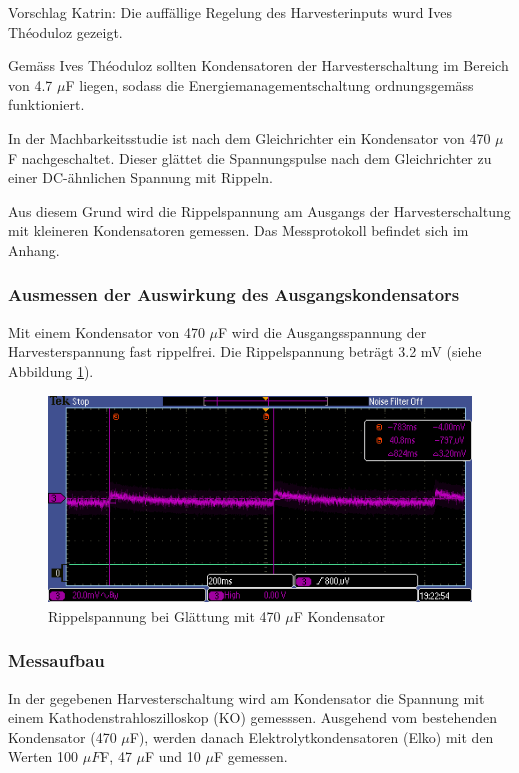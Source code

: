 Vorschlag Katrin:
Die auffällige Regelung des Harvesterinputs wurd Ives Théoduloz gezeigt. 

Gemäss Ives Théoduloz sollten Kondensatoren der Harvesterschaltung im Bereich von 4.7 $\mu$F liegen, sodass die Energiemanagementschaltung ordnungsgemäss funktioniert.  


In der Machbarkeitsstudie ist nach dem Gleichrichter ein Kondensator von 470 $\mu$F nachgeschaltet. Dieser glättet die Spannungspulse nach dem Gleichrichter zu einer DC-ähnlichen Spannung mit Rippeln.

Aus diesem Grund wird die Rippelspannung am Ausgangs der Harvesterschaltung mit kleineren Kondensatoren gemessen. Das Messprotokoll befindet sich im Anhang.

\subsubsection{Ausmessen der Auswirkung des Ausgangskondensators}

Mit einem Kondensator von 470 $\mu$F wird die Ausgangsspannung der Harvesterspannung fast rippelfrei. Die Rippelspannung beträgt 3.2 mV (siehe Abbildung \ref{kond470uF}).

\begin{figure}
    \includegraphics[width=15cm]{3Vorgehen/imag/470uF.PNG}
    \caption{Rippelspannung bei Glättung mit 470 $\mu$F Kondensator}\label{kond470uF} 
\end{figure}

\subsubsection*{Messaufbau}
In der gegebenen Harvesterschaltung wird am Kondensator die Spannung mit einem Kathodenstrahloszilloskop (KO) gemesssen. Ausgehend vom bestehenden Kondensator (470 $ \mu $F), werden danach Elektrolytkondensatoren (Elko) mit den Werten 100 $\mu F $F, 47 $\mu$F und 10 $\mu$F gemessen.

